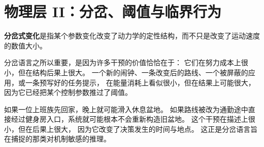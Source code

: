 \section{物理层 II：分岔、阈值与临界行为}

\begin{definition}[分岔式变化]
\textbf{分岔式变化}是指某个参数变化改变了动力学的定性结构，而不只是改变了运动速度的数值大小。
\end{definition}

分岔语言之所以重要，是因为许多干预的价值恰恰在于：
它们在努力成本上很小，但在结构后果上很大。
一个新的闹钟、一条改变后的路线、一个被屏蔽的应用，或一条预写好的任务提示，
在能量消耗上看似很小，但在结果上可能很大，
因为它已经把某个控制参数推过了阈值。

\begin{example}[通勤到健身房的路径设计]
如果一位上班族先回家，晚上就可能滑入休息盆地。
如果路线被改为通勤途中直接经过健身房入口，系统就可能根本不会重新构造旧盆地。
这个干预在描述上很小，但在后果上很大，
因为它改变了决策发生的时间与地点。
这正是分岔语言旨在捕捉的那类对机制敏感的推理。
\end{example}